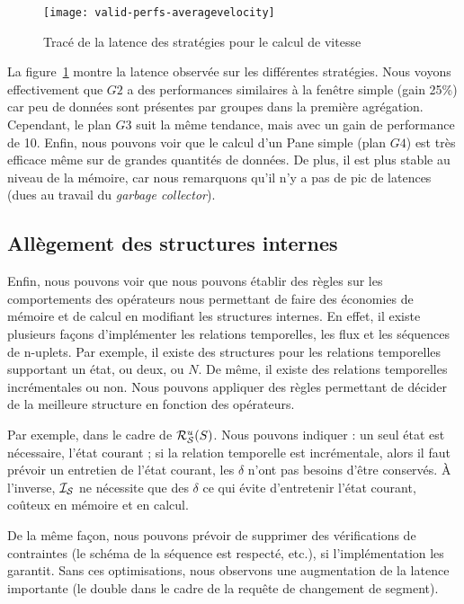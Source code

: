 \begin{figure}[ht]
\centering
\texttt{[image: valid-perfs-averagevelocity]}
\caption{Tracé de la latence des stratégies pour le calcul de vitesse}\label{fig:valid:perfs:averagevelocity}
\end{figure}

La figure~\ref{fig:valid:perfs:averagevelocity} montre la latence observée sur les différentes stratégies. Nous voyons effectivement que $G2$ a des performances similaires à la fenêtre simple (gain 25\%) car peu de données sont présentes par groupes dans la première agrégation. Cependant, le plan $G3$ suit la même tendance, mais avec un gain de performance de 10. Enfin, nous pouvons voir que le calcul d'un Pane simple (plan $G4$) est très efficace même sur de grandes quantités de données. De plus, il est plus stable au niveau de la mémoire, car nous remarquons qu'il n'y a pas de pic de latences (dues au travail du \textit{garbage collector}).

\subsection{Allègement des structures internes}
Enfin, nous pouvons voir que nous pouvons établir des règles sur les comportements des opérateurs nous permettant de faire des économies de mémoire et de calcul en modifiant les structures internes. En effet, il existe plusieurs façons d'implémenter les relations temporelles, les flux et les séquences de n-uplets. Par exemple, il existe des structures pour les relations temporelles supportant un état, ou deux, ou $N$. De même, il existe des relations temporelles incrémentales ou non. Nous pouvons appliquer des règles permettant de décider de la meilleure structure en fonction des opérateurs.

Par exemple, dans le cadre de $\mathcal{R}_{\mathcal S}^{u}(S)$. Nous pouvons indiquer : un seul état est nécessaire, l'état courant ; si la relation temporelle est incrémentale, alors il faut prévoir un entretien de l'état courant, les $\delta$ n'ont pas besoins d'être conservés. À l'inverse, $\mathcal{I_S}$ ne nécessite que des $\delta$ ce qui évite d'entretenir l'état courant, coûteux en mémoire et en calcul.

De la même façon, nous pouvons prévoir de supprimer des vérifications de contraintes (le schéma de la séquence est respecté, etc.), si l'implémentation les garantit. Sans ces optimisations, nous observons une augmentation de la latence importante (le double dans le cadre de la requête de changement de segment).